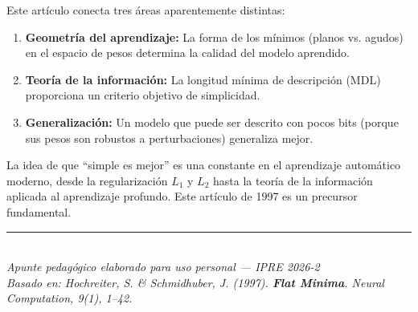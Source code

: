 \documentclass[11pt,a4paper]{article}
\begin{document}
Este artículo conecta tres áreas aparentemente distintas:

\begin{enumerate}
    \item \textbf{Geometría del aprendizaje:} La forma de los mínimos (planos vs. agudos) en el espacio de pesos determina la calidad del modelo aprendido.
    \item \textbf{Teoría de la información:} La longitud mínima de descripción (MDL) proporciona un criterio objetivo de simplicidad.
    \item \textbf{Generalización:} Un modelo que puede ser descrito con pocos bits (porque sus pesos son robustos a perturbaciones) generaliza mejor.
\end{enumerate}

La idea de que ``simple es mejor'' es una constante en el aprendizaje automático moderno, desde la regularización $L_1$ y $L_2$ hasta la teoría de la información aplicada al aprendizaje profundo. Este artículo de 1997 es un precursor fundamental.

\vspace{1cm}
\begin{center}
{\color{grisclaro}\rule{10cm}{0.4pt}}\\[0.3cm]
{\small\textit{Apunte pedagógico elaborado para uso personal — IPRE 2026-2 \\ Basado en: Hochreiter, S. \& Schmidhuber, J. (1997). \textbf{Flat Minima}. Neural Computation, 9(1), 1--42.}}
\end{center}
\end{document}
